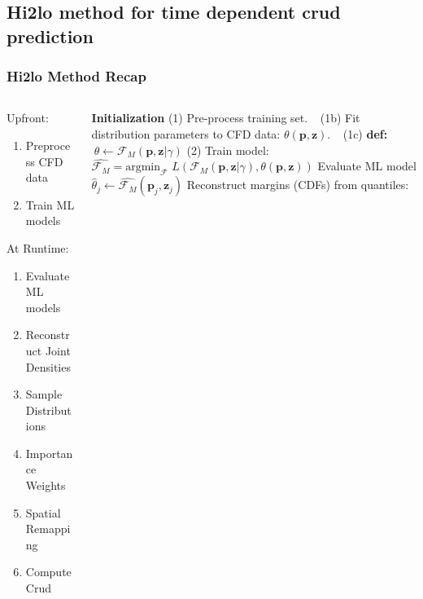 \documentclass[t, pdftex]{beamer}
\begin{document}
\subsection*{Hi2lo method for time dependent crud prediction}
\begin{frame}
\frametitle{Hi2lo Method Recap}
\vspace{-28pt}
\begin{columns}
	\vspace{22pt}
	\begin{column}{0.5\textwidth}
		
		Upfront:
		\begin{enumerate}
			\item Preprocess CFD data
			\item Train ML models
		\end{enumerate}
		\vspace{18pt}
		At Runtime:
		\begin{enumerate}
			\item Evaluate ML models
			\item Reconstruct Joint Densities
			\item Sample Distributions
			\item Importance Weights
			\item Spatial Remapping
			\item Compute Crud
		\end{enumerate}
	\end{column}
	\begin{column}{0.5\textwidth}
		\begin{algorithm}[H]
			\tiny      
			\begin{algorithmic}[1]      
				\STATE \textbf{Initialization}  
				\STATE (1) Pre-process training set.  
				\STATE $\ \ $   (1b) Fit distribution parameters to CFD data: $\theta(\mathbf p, \mathbf z)$.  
				\STATE $\ \ $   (1c) \textbf{def:}  $\ \theta \leftarrow \mathcal F_M(\mathbf p, \mathbf z | \gamma)$
				\STATE (2) Train model:  \\ $\hat{\mathcal F_M} =  \mathrm{argmin}_{\mathcal F}$ 
				$L(\mathcal{F}_M (\mathbf p, \mathbf z| \gamma), \theta(\mathbf p, \mathbf z)) $
				\STATE Evaluate ML model $\hat \theta_j \leftarrow \hat{\mathcal F_M}(\mathbf p_j, \mathbf z_j)$ 
				\STATE Reconstruct margins (CDFs) from quantiles:  \\

\end{algorithmic}
\end{algorithm}
\end{column}
\end{columns}
\end{frame}
\end{document}

